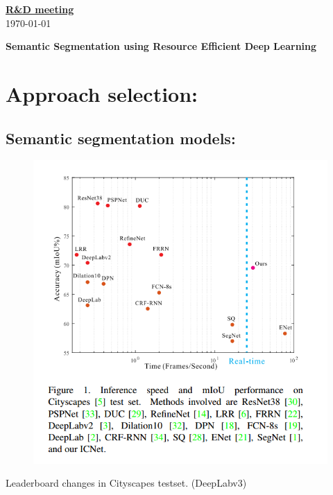 \documentclass[14pt]{extarticle}
\begin{document}
\begin{center}
\begin{Large}

\underline{\textbf{R\&D meeting}}\\
\vspace{3mm}
\today
\vspace{3mm}

\textbf{Semantic Segmentation using Resource Efficient Deep Learning}

\end{Large}
\end{center}

\section{Approach selection:}
\subsection{Semantic segmentation models:}

\begin{figure}[!htb]
	\centering
	\includegraphics[scale=0.6]{from_icnet}
\end{figure}

Leaderboard changes in Cityscapes testset. (DeepLabv3)
\end{document}
